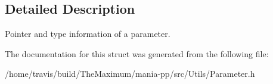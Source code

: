 \subsection{Detailed Description}
Pointer and type information of a parameter. 

The documentation for this struct was generated from the following file\-:\begin{DoxyCompactItemize}
\item 
/home/travis/build/\-The\-Maximum/mania-\/pp/src/\-Utils/Parameter.\-h\end{DoxyCompactItemize}

